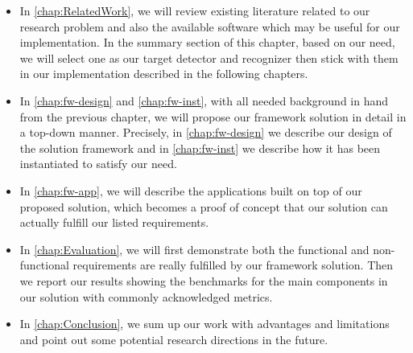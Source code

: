 \begin{itemize}
    \item In \autoref{chap:RelatedWork}, we will review existing literature
    related to our research problem and also the available software which may be
    useful for our implementation. In the summary section of this chapter,
    based on our need, we will select one as our target detector and recognizer
    then stick with them in our implementation described in the following
    chapters.

    \item In \autoref{chap:fw-design} and \autoref{chap:fw-inst}, with all
    needed background in hand from the previous chapter, we will propose our
    framework solution in detail in a top-down manner. 
    Precisely, in \autoref{chap:fw-design} we describe our design of the
    solution framework and in \autoref{chap:fw-inst} we describe how it has been
    instantiated to satisfy our need.

    \item In \autoref{chap:fw-app}, we will describe the applications built on
    top of our proposed solution, which becomes a proof of concept that our
    solution can actually fulfill our listed requirements.

    \item In \autoref{chap:Evaluation}, we will first demonstrate both the
    functional and non-functional requirements are really fulfilled by our
    framework solution. Then we report our results showing the benchmarks for 
    the main components in our solution with commonly acknowledged metrics.

    \item In \autoref{chap:Conclusion}, we sum up our work with advantages and
	limitations and point out some potential research directions in the future.
\end{itemize}

